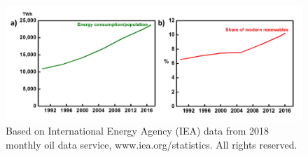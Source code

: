\begin{figure}[tbh!]
\centering
\includegraphics[width=\textwidth]{Figures/chap1fig/IEC2}
\caption{Based on International Energy Agency (IEA) data from 2018 monthly oil data service, www.iea.org/statistics. All rights reserved.}
\label{Figures/chap1fig:IEC2}
\end{figure}

